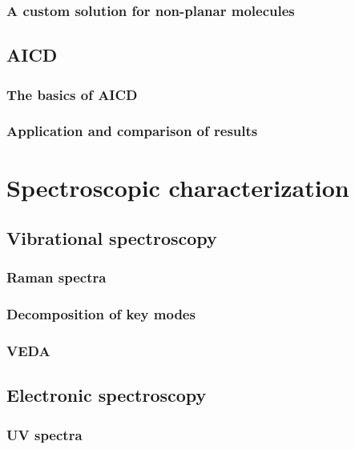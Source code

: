 \subsubsection{A custom solution for non-planar molecules}
\blindtext

\subsection{AICD}
\subsubsection{The basics of AICD}
\blindtext
\subsubsection{Application and comparison of results}
\blindtext


\section{Spectroscopic characterization}

\subsection{Vibrational spectroscopy}
\subsubsection{Raman spectra}
\blindtext
\subsubsection{Decomposition of key modes}
\blindtext
\subsubsection{VEDA}
\blindtext

\subsection{Electronic spectroscopy}
\subsubsection{UV spectra}
\blindtext
